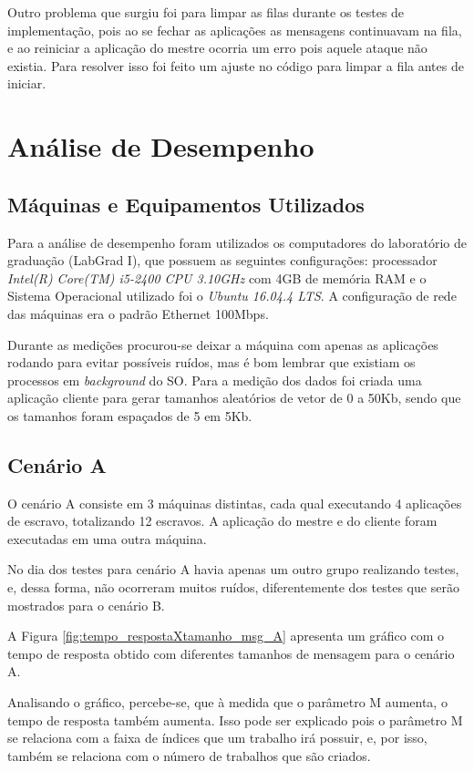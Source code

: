 \documentclass[
	12pt,				%
    oneside,			%
	a4paper,			%
	english,			%
	brazil,				%
	]{abntex2}
\begin{document}
Outro problema que surgiu foi para limpar as filas durante os testes de implementação, pois ao se fechar as aplicações as mensagens continuavam na fila, e ao reiniciar a aplicação do mestre ocorria um erro pois aquele ataque não existia. Para resolver isso foi feito um ajuste no código para limpar a fila antes de iniciar.


\chapter{Análise de Desempenho} 

\section{Máquinas e Equipamentos Utilizados}

Para a análise de desempenho foram utilizados os computadores do laboratório de graduação (LabGrad I), que possuem as seguintes configurações: processador \textit{Intel(R) Core(TM) i5-2400 CPU 3.10GHz} com 4GB de memória RAM e o Sistema Operacional utilizado foi o \textit{Ubuntu 16.04.4 LTS}. A configuração de rede das máquinas era o padrão Ethernet 100Mbps. 

Durante as medições procurou-se deixar a máquina com apenas as aplicações rodando para evitar possíveis ruídos, mas é bom lembrar que existiam os processos em \textit{background} do SO. Para a medição dos dados foi criada uma aplicação cliente para gerar tamanhos aleatórios de vetor de 0 a 50Kb, sendo que os tamanhos foram espaçados de 5 em 5Kb.

\section{Cenário A}

O cenário A consiste em 3 máquinas distintas, cada qual executando 4 aplicações de escravo, totalizando 12 escravos. A aplicação do mestre e do cliente foram executadas em uma outra máquina. 

No dia dos testes para cenário A havia apenas um outro grupo realizando testes, e, dessa forma, não ocorreram muitos ruídos, diferentemente dos testes que serão mostrados para o cenário B.



A Figura \ref{fig:tempo_respostaXtamanho_msg_A} apresenta um gráfico com o tempo de resposta obtido com diferentes tamanhos de mensagem para o cenário A.

Analisando o gráfico, percebe-se, que à medida que o parâmetro M aumenta, o tempo de resposta também aumenta. Isso pode ser explicado pois o parâmetro M se relaciona com a faixa de índices que um trabalho irá possuir, e, por isso, também se relaciona com o número de trabalhos que são criados. 
\end{document}
